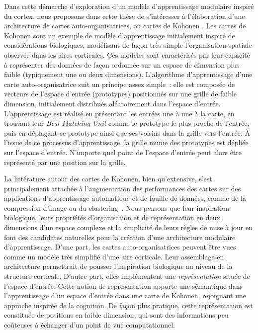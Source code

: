 Dans cette démarche d'exploration d'un modèle d'apprentissage modulaire inspiré du cortex, nous proposons dans cette thèse de s'intéresser à l'élaboration d'une architecture de cartes auto-organisatrices, ou cartes de Kohonen \parencite{Kohonen1982}.
Les cartes de Kohonen sont un exemple de modèle d'apprentissage initialement inspiré de considérations biologiques, modélisant de façon très simple l'organisation spatiale observée dans les aires corticales.
Ces modèles sont caractérisés par leur capacité à représenter des données de façon ordonnée sur un espace de dimension plus faible (typiquement une ou deux dimensions).
L'algorithme d'apprentissage d'une carte auto-organisatrice suit un principe assez simple~: elle est composée de vecteurs de l'espace d'entrée (prototypes) positionnés sur une grille de faible dimension, initialement distribués aléatoirement dans l'espace d'entrée. L'apprentissage est réalisé en présentant les entrées une à une à la carte, en trouvant leur \emph{Best Matching Unit} comme le prototype le plus proche de l'entrée, puis en déplaçant ce prototype ainsi que ses voisins dans la grille vers l'entrée.
\`A l'issue de ce processus d'apprentissage, la grille munie des prototypes est dépliée sur l'espace d'entrée. N'importe quel point de l'espace d'entrée peut alors être représenté par une position sur la grille.

La littérature autour des cartes de Kohonen, bien qu'extensive, s'est principalement attachée à l'augmentation des performances des cartes sur des applications d'apprentissage automatique et de fouille de données, comme de la compression d'image ou du clustering~\parencite{kohonen_essentials_2013}.
Nous pensons que leur inspiration biologique, leurs propriétés d'organisation et de représentation en deux dimensions d'un espace complexe et la simplicité de leurs règles de mise à jour en font des candidates naturelles pour la création d'une architecture modulaire d'apprentissage.
D'une part, les cartes auto-organisatrices peuvent être vues comme un modèle très simplifié d'une aire corticale. Leur assemblage en architecture permettrait de pousser l'inspiration biologique au niveau de la structure corticale.
D'autre part, elles implémentent une \emph{représentation} située de l'espace d'entrée. Cette notion de représentation apporte une sémantique dans l'apprentissage d'un espace d'entrée dans une carte de Kohonen, rejoignant une approche inspirée de la cognition.
De façon plus pratique, cette représentation est constituée de positions en faible dimension, qui sont des informations peu coûteuses à échanger d'un point de vue computationnel.

